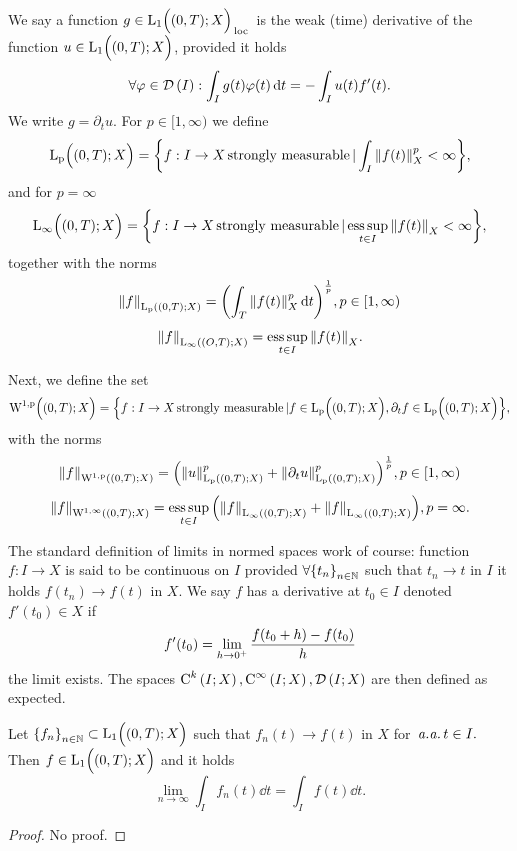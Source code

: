 \documentclass{article}
\begin{document}
\begin{definition}
	We say a function $g \in \text{L}_{\text{1}}\!\,\Bigl( (0,T);X \Bigr)_{\, \text{loc} \,}$  is the weak (time) derivative of the function $u \in \text{L}_{\text{1}}\!\,\Bigl( (0,T);X \Bigr)$, provided it holds
	\[
		\forall \varphi \in \mathcal{D}\!\,\left(I \right): \int_I g(t) \varphi(t) \dd{t} = - \int_I u(t) f'(t).
	\]
	We write $g = \partial_t u.$ 
	For $p \in [1, \infty)$ we define
	\[
		\text{L}_{\text{p}}\!\,\Bigl( (0,T);X \Bigr) = \qty{f: I \to X \, \text{strongly measurable} \,| \int_I \norm{f(t)}_X^p < \infty},
	\]
	and for $p = \infty$
	\[
		\text{L}_{\infty}\!\,\Bigl( (0,T);X \Bigr) = \qty{f: I \to X \, \text{strongly measurable} \,| \operatorname*{ess\,sup}_{t \in I}\norm{f(t)}_X < \infty},
	\]
	together with the norms
	\[
		\norm{f}_{\text{L}_{\text{p}}\!\,\left( (0,T);X \right)} = \qty(\int_T \norm{f(t)}_X^p \dd{t})^{\frac{1}{p}}, p \in [1, \infty)
	\]
	\[
		\norm{f}_{\text{L}_{\infty}\!\,\left( (O,T);X \right)} = \operatorname*{ess\,sup}_{t \in I} \norm{f(t)}_X.
	\]

	Next, we define the set
	\[
		\text{W}^{1,\text{p}}\!\,\Bigl( (0,T);X \Bigr) = \qty{f: I \to X \, \text{strongly measurable} \,| f \in  \ensuremath{\text{L}_{\text{p}}\!\,\Bigl( (0,T);X \Bigr)} , \partial_t f \in  \ensuremath{\text{L}_{\text{p}}\!\,\Bigl( (0,T);X \Bigr)} },
	\]
	with the norms
	\[
		\norm{f}_{\text{W}^{1,\text{p}}\!\,\left( (0,T);X \right)} = \qty(\norm{u}_{\text{L}_{\text{p}}\!\,\left( (0,T);X \right)}^p + \norm{\partial_t u}_{\text{L}_{\text{p}}\!\,\left( (0,T);X \right)}^p)^{\frac{1}{p}}, p \in [1, \infty)
	\]
	\[
		\norm{f}_{\text{W}^{1,\infty}\!\,\left( (0,T);X \right)} = \operatorname*{ess\,sup}_{t \in I}\qty(\norm{f}_{\text{L}_{\infty}\!\,\left( (0,T);X \right)} + \norm{f}_{\text{L}_{\infty}\!\,\left( (0,T);X \right)}), p = \infty.
	\]
	
\end{definition}
\begin{definition}
	The standard definition of limits in normed spaces work of course: function $f: I \to X$ is said to be continuous on $I$ provided $\forall \qty{t_n}_{n \in {\mathbb N}}$ such that $t_n \to t$ in $I$ it holds $f(t_n) \to f(t)$ in $X$.
	We say $f$ has a derivative at $t_0 \in I$ denoted $f'(t_0) \in X $ if
	\[
		f'(t_0) = \lim_{h \to 0^+}\frac{f\qty(t_0 +h) -  f(t_0)}{h}
	\]
	the limit exists.
	The spaces $\text{C}^{k}\!\,\left(I;X \right), \text{C}^{\infty}\!\,\left(I;X \right), \mathcal{D}\!\,\left(I;X \right)$ are then defined as expected.
\end{definition}

\begin{lemma}
	Let $\qty{f_n}_{n \in {\mathbb N}} \subset \text{L}_{\text{1}}\!\,\Bigl( (0,T);X \Bigr)$ such that $f_n(t) \to f(t)$ in $X$ for $\, \text{\textit{a.a.}} \, t \in I.$ Then $f \in \text{L}_{\text{1}}\!\,\Bigl( (0,T);X \Bigr)$ and it holds
	\[
		\lim_{n \to \infty}\int_I f_n(t) \dd{t} = \int_I f(t) \dd{t}.
	\]
\end{lemma}
\begin{proof}
    No proof.
\end{proof}
\end{document}
